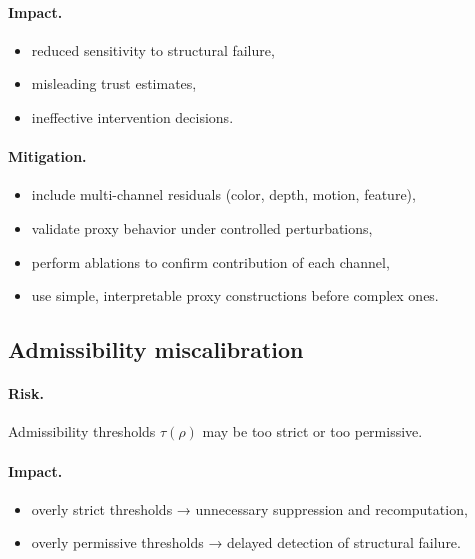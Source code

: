 \documentclass[11pt]{article}
\theoremstyle{definition}
\theoremstyle{plain}
\begin{document}
\paragraph{Impact.}
\begin{itemize}[leftmargin=1.5em]
    \item reduced sensitivity to structural failure,
    \item misleading trust estimates,
    \item ineffective intervention decisions.
\end{itemize}

\paragraph{Mitigation.}
\begin{itemize}[leftmargin=1.5em]
    \item include multi-channel residuals (color, depth, motion, feature),
    \item validate proxy behavior under controlled perturbations,
    \item perform ablations to confirm contribution of each channel,
    \item use simple, interpretable proxy constructions before complex ones.
\end{itemize}


\subsection{Admissibility miscalibration}

\paragraph{Risk.}
Admissibility thresholds $\tau(\rho)$ may be too strict or too permissive.

\paragraph{Impact.}
\begin{itemize}[leftmargin=1.5em]
    \item overly strict thresholds → unnecessary suppression and recomputation,
    \item overly permissive thresholds → delayed detection of structural failure.
\end{itemize}
\end{document}

